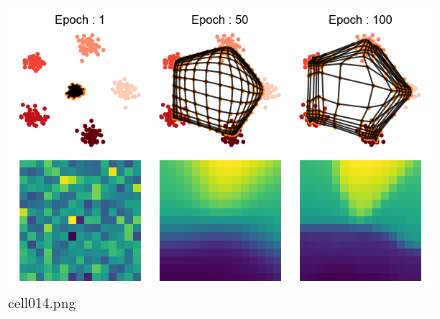 \begin{figure}[ht]
	\centering
	\includegraphics[scale=0.8, max width=\linewidth]{./fig/local-learning-rule/self-organizing-map/cell014.png}
	\caption{cell014.png}
	\label{cell014.png}
\end{figure}